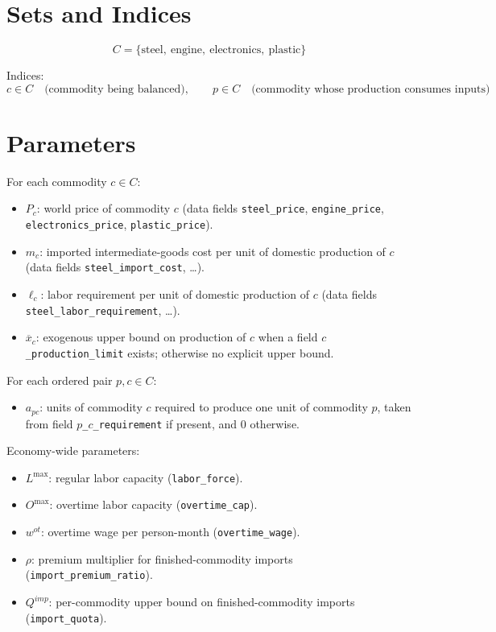\section*{Sets and Indices}

\[
C = \{\text{steel},\ \text{engine},\ \text{electronics},\ \text{plastic}\}
\]

Indices:
\[
c \in C \quad \text{(commodity being balanced)}, \qquad
p \in C \quad \text{(commodity whose production consumes inputs)}
\]

\section*{Parameters}

For each commodity \(c \in C\):
\begin{itemize}
    \item \(P_c\): world price of commodity \(c\) (data fields \texttt{steel\_price}, \texttt{engine\_price}, \texttt{electronics\_price}, \texttt{plastic\_price}).
    \item \(m_c\): imported intermediate-goods cost per unit of domestic production of \(c\) (data fields \texttt{steel\_import\_cost}, \dots).
    \item \(\ell_c\): labor requirement per unit of domestic production of \(c\) (data fields \texttt{steel\_labor\_requirement}, \dots).
    \item \(\overline{x}_c\): exogenous upper bound on production of \(c\) when a field \texttt{\(c\)\_production\_limit} exists; otherwise no explicit upper bound.
\end{itemize}

For each ordered pair \(p,c \in C\):
\begin{itemize}
    \item \(a_{pc}\): units of commodity \(c\) required to produce one unit of commodity \(p\), taken from field \texttt{\(p\)\_\(c\)\_requirement} if present, and \(0\) otherwise.
\end{itemize}

Economy-wide parameters:
\begin{itemize}
    \item \(L^{\max}\): regular labor capacity (\texttt{labor\_force}).
    \item \(O^{\max}\): overtime labor capacity (\texttt{overtime\_cap}).
    \item \(w^{ot}\): overtime wage per person-month (\texttt{overtime\_wage}).
    \item \(\rho\): premium multiplier for finished-commodity imports (\texttt{import\_premium\_ratio}).
    \item \(Q^{imp}\): per-commodity upper bound on finished-commodity imports (\texttt{import\_quota}).
\end{itemize}

